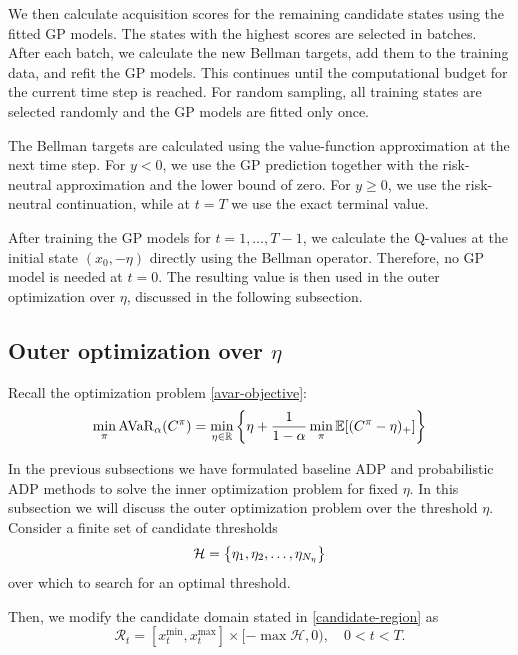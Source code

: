 We then calculate acquisition scores for the remaining candidate states using the fitted GP models. The states with the highest scores are selected in batches. After each batch, we calculate the new Bellman targets, add them to the training data, and refit the GP models. This continues until the computational budget for the current time step is reached. For random sampling, all training states are selected randomly and the GP models are fitted only once.

The Bellman targets are calculated using the value-function approximation at the next time step. For $y<0$, we use the GP prediction together with the risk-neutral approximation and the lower bound of zero. For $y\geq 0$, we use the risk-neutral continuation, while at $t=T$ we use the exact terminal value.

After training the GP models for $t=1,\ldots,T-1$, we calculate the Q-values at the initial state $(x_0,-\eta)$ directly using the Bellman operator. Therefore, no GP model is needed at $t=0$. The resulting value is then used in the outer optimization over $\eta$, discussed in the following subsection.

\subsection{Outer optimization over $\eta$}
\label{method:outer-optimization}

Recall the optimization problem \eqref{avar-objective}:
\begin{equation*}
	\displaystyle \min_{\pi} \operatorname{AVaR}_{\alpha}(C^{\pi}) = \min_{\eta \in \mathbb{R}} \left\{ \eta + \frac{1}{1 - \alpha} \min_{\pi} \mathbb{E} [(C^{\pi} - \eta)_+] \right\}
\end{equation*}

In the previous subsections we have formulated baseline ADP and probabilistic ADP methods to solve the inner optimization problem for fixed $\eta$. In this subsection we will discuss the outer optimization problem over the threshold $\eta$. Consider a finite set of candidate thresholds
\begin{equation}
	\mathcal{H} = \left\{ \eta_1, \eta_2, \dots, \eta_{N_{\eta}} \right\}
	\notag
	\label{eta-family}
\end{equation}
over which to search for an optimal threshold.

Then, we modify the candidate domain stated in \eqref{candidate-region} as
\begin{equation}
	\mathcal{R}_t = [x_t^{\min},x_t^{\max}] \times[-\max\mathcal{H}, 0), \quad 0<t<T.
	\label{candidate-set-multiple-eta}
\end{equation}

